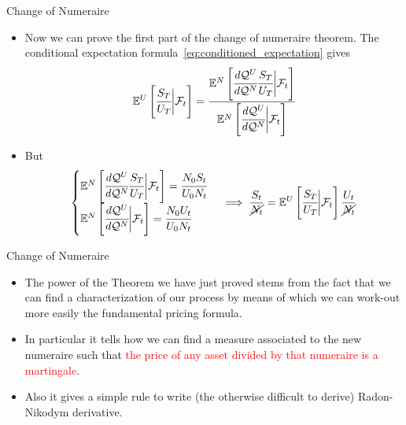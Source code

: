 \documentclass{beamer}
\begin{document}
\begin{frame}{Change of Numeraire}
	\begin{itemize}
	\item Now we can prove the first part of the change of numeraire theorem. The conditional expectation formula~\cref{eq:conditioned_expectation} gives
	\begin{equation*}
		\mathbb{E}^U\left[\cfrac{S_T}{U_T}\bigg|\mathcal{F}_t\right]=\cfrac{\mathbb{E}^N\left[\cfrac{d\mathcal{Q}^U}{d\mathcal{Q}^N}\cfrac{S_T}{U_T}\bigg|\mathcal{F}_t\right]}{\mathbb{E}^N\left[\cfrac{d\mathcal{Q}^U}{d\mathcal{Q}^N}\bigg|\mathcal{F}_t\right]}
	\end{equation*}
	\item But 
	\begin{equation*}
		\begin{cases}
		\mathbb{E}^N\left[\cfrac{d\mathcal{Q}^U}{d\mathcal{Q}^N}\cfrac{S_T}{U_T}\bigg|\mathcal{F}_t\right]=\cfrac{N_0 S_t}{U_0 N_t} \\
		\mathbb{E}^N\left[\cfrac{d\mathcal{Q}^U}{d\mathcal{Q}^N}\bigg|\mathcal{F}_t\right]=\cfrac{N_0 U_t}{U_0 N_t}
		\end{cases}\implies
		\frac{S_t}{\cancel{N_t}}=\mathbb{E}^U\left[\cfrac{S_T}{U_T}\bigg|\mathcal{F}_t\right]\frac{U_t}{\cancel{N_t}}
	\end{equation*}
    \end{itemize}
\end{frame}	

\begin{frame}{Change of Numeraire}
	\begin{itemize}
		\item The power of the Theorem we have just proved stems from the fact that we can find a characterization of our process by means of which we can work-out more easily the fundamental pricing formula.
		\item In particular it tells how we can find a measure associated to the new numeraire such that \textcolor{red}{the price of any asset divided by that numeraire is a martingale}.
		\item Also it gives a simple rule to write (the otherwise difficult to derive) Radon-Nikodym derivative.
	\end{itemize}
\end{frame}
\end{document}
